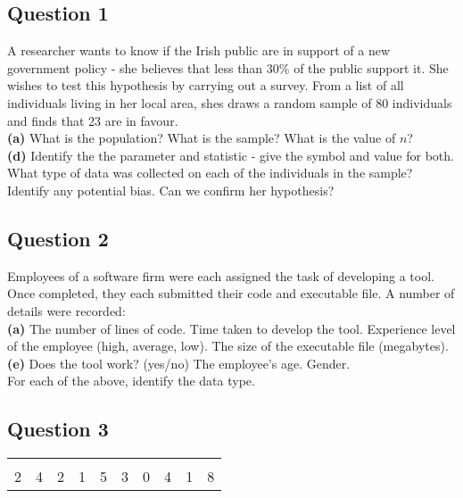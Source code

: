 \documentclass[12pt]{article}
\begin{document}
\subsection*{Question 1}
A researcher wants to know if the Irish public are in support of a new government policy - she believes that less than 30\% of the public support it. She wishes to test this hypothesis by carrying out a survey. From a list of all individuals living in her local area, shes draws a random sample of 80 individuals and finds that 23 are in favour.\\[-0.2cm]

{\bf(a)} What is the population? What is the sample? What is the value of $n$?\quad \\{\bf(d)} Identify the the parameter and statistic - give the symbol and value for both. What type of data was collected on each of the individuals in the sample?   Identify any potential bias. Can we confirm her hypothesis?

\subsection*{Question 2}
Employees of a software firm were each assigned the task of developing a tool. Once completed, they each submitted their code and executable file. A number of details were recorded:\\[-0.2cm]

{\bf(a)} The number of lines of code. Time taken to develop the tool.  Experience level of the employee (high, average, low).  The size of the executable file (megabytes).\quad \\ {\bf(e)} Does the tool work? (yes/no)   The employee's age. Gender.\\[-0.2cm]

For each of the above, identify the data type.

\subsection*{Question 3}

\begin{center}
\begin{tabular}{|cccccccccc|}
\hline
&&&&&&&&&\\[-0.4cm]
2 & 4 & 2 & 1 & 5 & 3 & 0 & 4 & 1 & 8 \\
\hline
\end{tabular}
\end{center}
\end{document}
